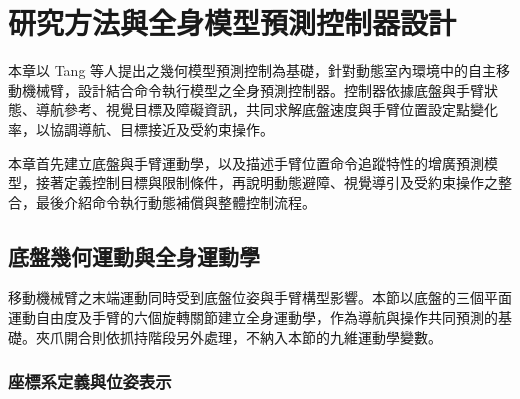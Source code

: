 

\chapter{研究方法與全身模型預測控制器設計}
\label{c:methodology}

本章以 Tang 等人\cite{tang2024gmpc}提出之幾何模型預測控制為基礎，針對動態室內環境中的自主移動機械臂，設計結合命令執行模型之全身預測控制器。控制器依據底盤與手臂狀態、導航參考、視覺目標及障礙資訊，共同求解底盤速度與手臂位置設定點變化率，以協調導航、目標接近及受約束操作。

本章首先建立底盤與手臂運動學，以及描述手臂位置命令追蹤特性的增廣預測模型，接著定義控制目標與限制條件，再說明動態避障、視覺導引及受約束操作之整合，最後介紹命令執行動態補償與整體控制流程。

\section{底盤幾何運動與全身運動學}
\label{sec:wholebody_kinematics}

移動機械臂之末端運動同時受到底盤位姿與手臂構型影響。本節以底盤的三個平面運動自由度及手臂的六個旋轉關節建立全身運動學，作為導航與操作共同預測的基礎。夾爪開合則依抓持階段另外處理，不納入本節的九維運動學變數。

\subsection{座標系定義與位姿表示}
\label{subsec:frames_pose_representation}

